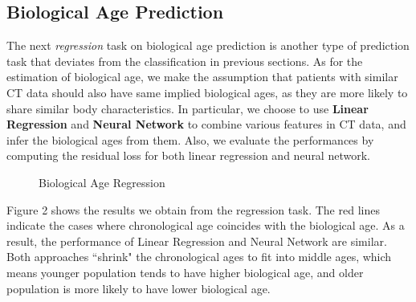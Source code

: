\documentclass{article}
\begin{document}
\subsection{Biological Age Prediction}

The next \textit{regression} task on biological age prediction is another type of prediction task that deviates from the classification in previous sections. As for the estimation of biological age, we make the assumption that patients with similar CT data should also have same implied biological ages, as they are more likely to share similar body characteristics. In particular, we choose to use \textbf{Linear Regression} and \textbf{Neural Network} to combine various features in CT data, and infer the biological ages from them. Also, we evaluate the performances by computing the residual loss for both linear regression and neural network.

\begin{figure}[h]
\centering     %
{}
\caption{Biological Age Regression}
\end{figure}

Figure 2 shows the results we obtain from the regression task. The red lines indicate the cases where chronological age coincides with the biological age. As a result, the performance of Linear Regression and Neural Network are similar. Both approaches ``shrink" the chronological ages to fit into middle ages, which means younger population tends to have higher biological age, and older population is more likely to have lower biological age. 
\end{document}
